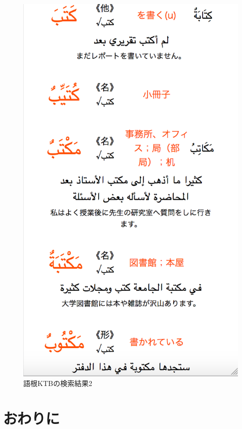 \documentclass[technicalreport]{ieicej}
\begin{document}
\begin{figure}[H]
\begin{minipage}{0.5\hsize}
\begin{center}
   \includegraphics[scale=0.3]{fig04.png}
  \end{center}
  \caption{語根KTBの検索結果2}
 \end{minipage}
\end{figure}

\section{おわりに}
\end{document}
